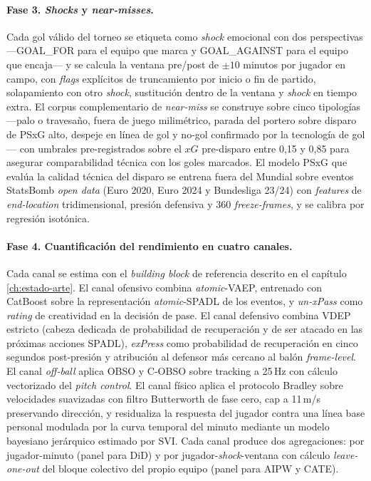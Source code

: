 \paragraph{Fase 3. \textit{Shocks} y \textit{near-misses}.}
Cada gol válido del torneo se etiqueta como \textit{shock} emocional
con dos perspectivas ---GOAL\_FOR para el equipo que marca y
GOAL\_AGAINST para el equipo que encaja--- y se calcula la ventana
pre/post de $\pm 10$ minutos por jugador en campo, con \textit{flags}
explícitos de truncamiento por inicio o fin de partido, solapamiento
con otro \textit{shock}, sustitución dentro de la ventana y \textit{shock}
en tiempo extra. El corpus complementario de \textit{near-miss} se
construye sobre cinco tipologías ---palo o travesaño, fuera de juego
milimétrico, parada del portero sobre disparo de PSxG alto, despeje
en línea de gol y no-gol confirmado por la tecnología de gol--- con
umbrales pre-registrados sobre el $xG$ pre-disparo entre 0{,}15 y
0{,}85 para asegurar comparabilidad técnica con los goles marcados.
El modelo PSxG que evalúa la calidad técnica del disparo se entrena
fuera del Mundial sobre eventos StatsBomb \textit{open data}
\parencite{StatsBombOpenData} (Euro 2020, Euro 2024 y Bundesliga 23/24) con \textit{features} de \textit{end-location}
tridimensional, presión defensiva y 360 \textit{freeze-frames}, y se
calibra por regresión isotónica.

\paragraph{Fase 4. Cuantificación del rendimiento en cuatro canales.}
Cada canal se estima con el \textit{building block} de referencia
descrito en el capítulo \ref{ch:estado-arte}. El canal ofensivo
combina \textit{atomic}-VAEP, entrenado con CatBoost sobre la
representación \textit{atomic}-SPADL de los eventos, y \textit{un-xPass}
como \textit{rating} de creatividad en la decisión de pase. El canal
defensivo combina VDEP estricto (cabeza dedicada de probabilidad de
recuperación y de ser atacado en las próximas acciones SPADL),
\textit{exPress} como probabilidad de recuperación en cinco segundos
post-presión y atribución al defensor más cercano al balón
\textit{frame-level}. El canal \textit{off-ball} aplica OBSO y C-OBSO
sobre tracking a 25\,Hz con cálculo vectorizado del \textit{pitch
control}. El canal físico aplica el protocolo Bradley sobre velocidades
suavizadas con filtro Butterworth de fase cero, cap a 11\,m/s
preservando dirección, y residualiza la respuesta del jugador contra
una línea base personal modulada por la curva temporal del minuto
mediante un modelo bayesiano jerárquico estimado por SVI. Cada canal
produce dos agregaciones: por jugador-minuto (panel para DiD) y por
jugador-\textit{shock}-ventana con cálculo \textit{leave-one-out} del
bloque colectivo del propio equipo (panel para AIPW y CATE).

